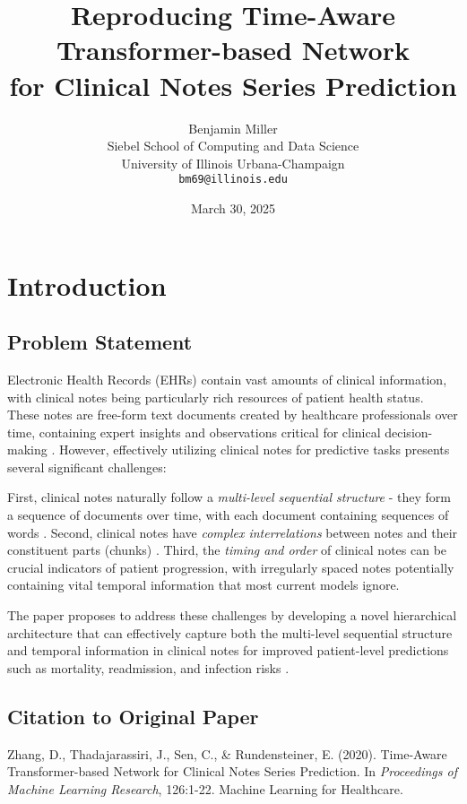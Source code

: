\documentclass[10pt,letterpaper,twocolumn]{article}
\title{\textbf{Reproducing Time-Aware Transformer-based Network\\for Clinical Notes Series Prediction}}
\author{Benjamin Miller \\
Siebel School of Computing and Data Science \\
University of Illinois Urbana-Champaign \\
\texttt{bm69@illinois.edu}}
\date{March 30, 2025}
\begin{document}
\twocolumn[
  \begin{@twocolumnfalse}
    \maketitle
    \thispagestyle{empty}
  \end{@twocolumnfalse}
]

\section{Introduction}

\subsection{Problem Statement}
Electronic Health Records (EHRs) contain vast amounts of clinical information, with clinical notes being particularly rich resources of patient health status. These notes are free-form text documents created by healthcare professionals over time, containing expert insights and observations critical for clinical decision-making \cite{johnson2016mimic}. However, effectively utilizing clinical notes for predictive tasks presents several significant challenges:

First, clinical notes naturally follow a \textit{multi-level sequential structure} - they form a sequence of documents over time, with each document containing sequences of words \cite{sen2019patient}. Second, clinical notes have \textit{complex interrelations} between notes and their constituent parts (chunks) \cite{huang2019clinicalbert}. Third, the \textit{timing and order} of clinical notes can be crucial indicators of patient progression, with irregularly spaced notes potentially containing vital temporal information that most current models ignore.

The paper proposes to address these challenges by developing a novel hierarchical architecture that can effectively capture both the multi-level sequential structure and temporal information in clinical notes for improved patient-level predictions such as mortality, readmission, and infection risks \cite{zhang2020time}.

\subsection{Citation to Original Paper}
Zhang, D., Thadajarassiri, J., Sen, C., \& Rundensteiner, E. (2020). Time-Aware Transformer-based Network for Clinical Notes Series Prediction\cite{zhang2020time}. In \textit{Proceedings of Machine Learning Research}, 126:1-22. Machine Learning for Healthcare.
\end{document}
